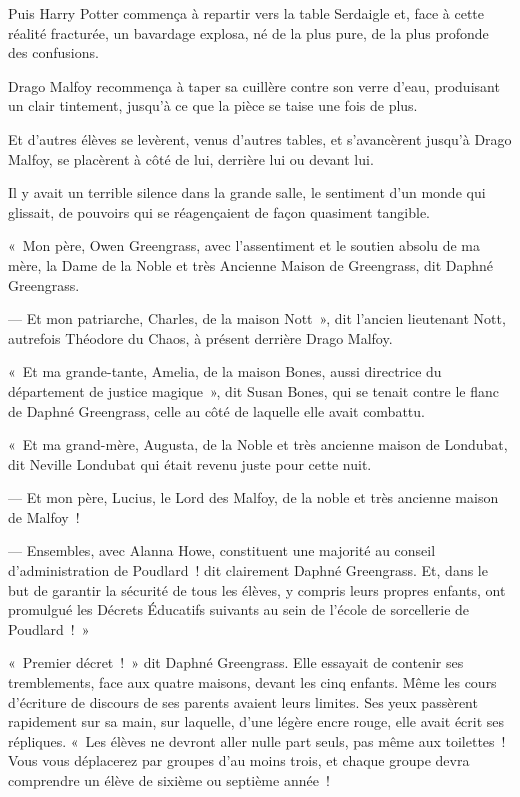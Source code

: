 Puis Harry Potter commença à repartir vers la table Serdaigle et, face à cette réalité fracturée, un bavardage explosa, né de la plus pure, de la plus profonde des confusions.

Drago Malfoy recommença à taper sa cuillère contre son verre d'eau, produisant un clair tintement, jusqu'à ce que la pièce se taise une fois de plus.

Et d'autres élèves se levèrent, venus d'autres tables, et s'avancèrent jusqu'à Drago Malfoy, se placèrent à côté de lui, derrière lui ou devant lui.

Il y avait un terrible silence dans la grande salle, le sentiment d'un monde qui glissait, de pouvoirs qui se réagençaient de façon quasiment tangible.

«~Mon père, Owen Greengrass, avec l'assentiment et le soutien absolu de ma mère, la Dame de la Noble et très Ancienne Maison de Greengrass, dit Daphné Greengrass.

--- Et mon patriarche, Charles, de la maison Nott~», dit l'ancien lieutenant Nott, autrefois Théodore du Chaos, à présent derrière Drago Malfoy.

«~Et ma grande-tante, Amelia, de la maison Bones, aussi directrice du département de justice magique~», dit Susan Bones, qui se tenait contre le flanc de Daphné Greengrass, celle au côté de laquelle elle avait combattu.

«~Et ma grand-mère, Augusta, de la Noble et très ancienne maison de Londubat, dit Neville Londubat qui était revenu juste pour cette nuit.

--- Et mon père, Lucius, le Lord des Malfoy, de la noble et très ancienne maison de Malfoy~!

--- Ensembles, avec Alanna Howe, constituent une majorité au conseil d'administration de Poudlard~! dit clairement Daphné Greengrass. Et, dans le but de garantir la sécurité de tous les élèves, y compris leurs propres enfants, ont promulgué les Décrets Éducatifs suivants au sein de l'école de sorcellerie de Poudlard~!~»

\later

«~Premier décret~!~» dit Daphné Greengrass. Elle essayait de contenir ses tremblements, face aux quatre maisons, devant les cinq enfants. Même les cours d'écriture de discours de ses parents avaient leurs limites. Ses yeux passèrent rapidement sur sa main, sur laquelle, d'une légère encre rouge, elle avait écrit ses répliques. «~Les élèves ne devront aller nulle part seuls, pas même aux toilettes~! Vous vous déplacerez par groupes d'au moins trois, et chaque groupe devra comprendre un élève de sixième ou septième année~!

